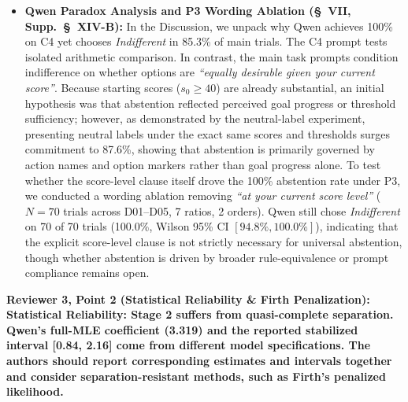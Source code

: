\documentclass[11pt]{article}
\newcommand{\reviewercomment}[1]{\vspace{1em}\noindent\textbf{\textcolor{commentcolor}{#1}}}
\begin{document}
\begin{itemize}[leftmargin=*]
\item \textbf{Qwen Paradox Analysis and P3 Wording Ablation (\S~VII, Supp.~\S~XIV-B):} In the Discussion, we unpack why Qwen achieves 100\% on C4 yet chooses \textit{Indifferent} in 85.3\% of main trials. The C4 prompt tests isolated arithmetic comparison. In contrast, the main task prompts condition indifference on whether options are \textit{``equally desirable given your current score''}. Because starting scores ($s_0 \ge 40$) are already substantial, an initial hypothesis was that abstention reflected perceived goal progress or threshold sufficiency; however, as demonstrated by the neutral-label experiment, presenting neutral labels under the exact same scores and thresholds surges commitment to 87.6\%, showing that abstention is primarily governed by action names and option markers rather than goal progress alone. To test whether the score-level clause itself drove the 100\% abstention rate under P3, we conducted a wording ablation removing \textit{``at your current score level''} ($N=70$ trials across D01--D05, 7 ratios, 2 orders). Qwen still chose \textit{Indifferent} on 70 of 70 trials (100.0\%, Wilson 95\% CI $[94.8\%, 100.0\%]$), indicating that the explicit score-level clause is not strictly necessary for universal abstention, though whether abstention is driven by broader rule-equivalence or prompt compliance remains open.
\end{itemize}

\reviewercomment{Reviewer 3, Point 2 (Statistical Reliability \& Firth Penalization): Statistical Reliability: Stage 2 suffers from quasi-complete separation. Qwen's full-MLE coefficient (3.319) and the reported stabilized interval [0.84, 2.16] come from different model specifications. The authors should report corresponding estimates and intervals together and consider separation-resistant methods, such as Firth's penalized likelihood.}
\end{document}
